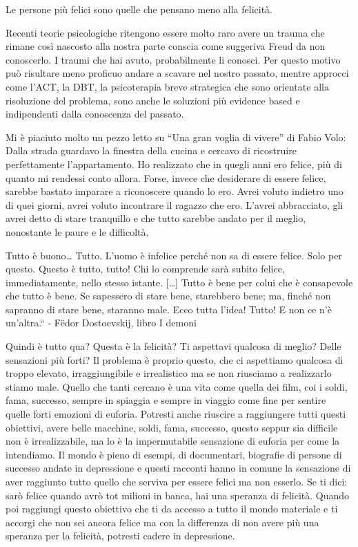 \documentclass[12pt]{book} %
\begin{document}
Le persone più felici sono quelle che pensano meno alla felicità.

Recenti teorie psicologiche ritengono essere molto raro avere un trauma che rimane così nascosto alla nostra parte conscia come
suggeriva Freud da non conoscerlo. I traumi che hai avuto, probabilmente li conosci. Per questo motivo può risultare
meno proficuo andare a scavare nel nostro passato, mentre approcci come l'ACT, la DBT, la psicoterapia breve strategica
che sono orientate alla risoluzione del problema, sono anche le soluzioni più evidence based e indipendenti dalla
conoscenza del passato.

Mi è piaciuto molto un pezzo letto su “Una gran voglia di vivere” di
Fabio Volo: Dalla strada guardavo la finestra della cucina e cercavo di ricostruire perfettamente
l'appartamento. Ho realizzato che in quegli anni ero felice, più di quanto mi rendessi conto
allora. Forse, invece che desiderare di essere felice, sarebbe bastato imparare a riconoscere quando lo ero. Avrei
voluto indietro uno di quei giorni, avrei voluto incontrare il ragazzo che ero. L'avrei
abbracciato, gli avrei detto di stare tranquillo e che tutto sarebbe andato per il meglio, nonostante le paure e le
difficoltà. 

Tutto è buono… Tutto. L'uomo è infelice perché non sa di essere felice. Solo per questo. Questo è tutto, tutto! Chi lo
comprende sarà subito felice, immediatamente, nello stesso istante. […] Tutto è bene per colui che è consapevole che
tutto è bene. Se sapessero di stare bene, starebbero bene; ma, finché non sapranno di stare bene, staranno male. Ecco
tutta l'idea! Tutto! E non ce n'è un'altra.“ - Fëdor Dostoevskij, libro I demoni

Quindi è tutto qua? Questa è la felicità? Ti aspettavi qualcosa di meglio? Delle sensazioni più forti? Il problema è
proprio questo, che ci aspettiamo qualcosa di troppo elevato, irraggiungibile e irrealistico ma se non riusciamo a
realizzarlo stiamo male. Quello che tanti cercano è una vita come quella dei film, coi i soldi, fama, successo,
sempre in spiaggia e sempre in viaggio come fine per sentire quelle forti emozioni di euforia. Potresti anche riuscire
a raggiungere tutti questi obiettivi, avere belle macchine, soldi, fama, successo, questo seppur sia difficile non è
irrealizzabile, ma lo è la impermutabile sensazione di euforia per come la intendiamo. Il mondo è pieno di esempi, di
documentari, biografie di persone di successo andate in depressione e questi racconti hanno in comune la
sensazione di aver raggiunto tutto quello che serviva per essere felici ma non esserlo. Se ti dici: sarò felice quando
avrò tot milioni in banca, hai una speranza di felicità. Quando poi raggiungi questo obiettivo che ti da accesso a
tutto il mondo materiale e ti accorgi che non sei ancora felice ma con la differenza di non avere più una speranza per
la felicità, potresti cadere in depressione.
\end{document}
